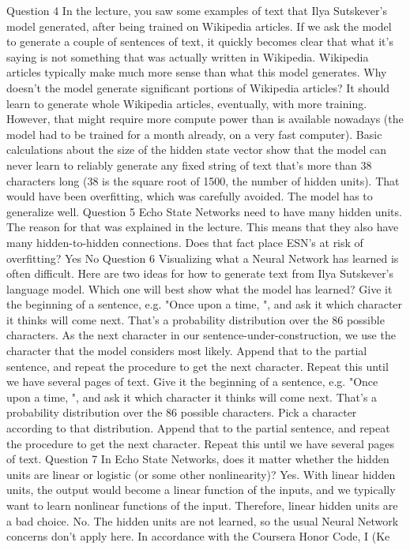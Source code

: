 Question 4
In the lecture, you saw some examples of text that Ilya Sutskever's model generated, after being trained on Wikipedia articles. If we ask the model to generate a couple of sentences of text, it quickly becomes clear that what it's saying is not something that was actually written in Wikipedia. Wikipedia articles typically make much more sense than what this model generates. Why doesn't the model generate significant portions of Wikipedia articles?
It should learn to generate whole Wikipedia articles, eventually, with more training. However, that might require more compute power than is available nowadays (the model had to be trained for a month already, on a very fast computer).
Basic calculations about the size of the hidden state vector show that the model can never learn to reliably generate any fixed string of text that's more than 38 characters long (38 is the square root of 1500, the number of hidden units).
That would have been overfitting, which was carefully avoided. The model has to generalize well.
Question 5
Echo State Networks need to have many hidden units. The reason for that was explained in the lecture. This means that they also have many hidden-to-hidden connections. Does that fact place ESN's at risk of overfitting?
Yes
No
Question 6
Visualizing what a Neural Network has learned is often difficult. Here are two ideas for how to generate text from Ilya Sutskever's language model. Which one will best show what the model has learned?
Give it the beginning of a sentence, e.g. "Once upon a time, ", and ask it which character it thinks will come next. That's a probability distribution over the 86 possible characters. As the next character in our sentence-under-construction, we use the character that the model considers most likely. Append that to the partial sentence, and repeat the procedure to get the next character. Repeat this until we have several pages of text.
Give it the beginning of a sentence, e.g. "Once upon a time, ", and ask it which character it thinks will come next. That's a probability distribution over the 86 possible characters. Pick a character according to that distribution. Append that to the partial sentence, and repeat the procedure to get the next character. Repeat this until we have several pages of text.
Question 7
In Echo State Networks, does it matter whether the hidden units are linear or logistic (or some other nonlinearity)?
Yes. With linear hidden units, the output would become a linear function of the inputs, and we typically want to learn nonlinear functions of the input. Therefore, linear hidden units are a bad choice.
No. The hidden units are not learned, so the usual Neural Network concerns don't apply here.
In accordance with the Coursera Honor Code, I (Ke
